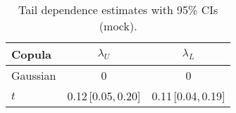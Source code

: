 \begin{table}[t]
  \centering
  \small
  \caption{Tail dependence estimates with 95\% CIs (mock).}
  \begin{tabular}{lcc}
    \toprule
    Copula & $\lambda_U$ & $\lambda_L$ \\
    \midrule
    Gaussian & 0 & 0 \\
    $t$      & 0.12\,[0.05,\,0.20] & 0.11\,[0.04,\,0.19] \\
    \bottomrule
  \end{tabular}
\end{table}
